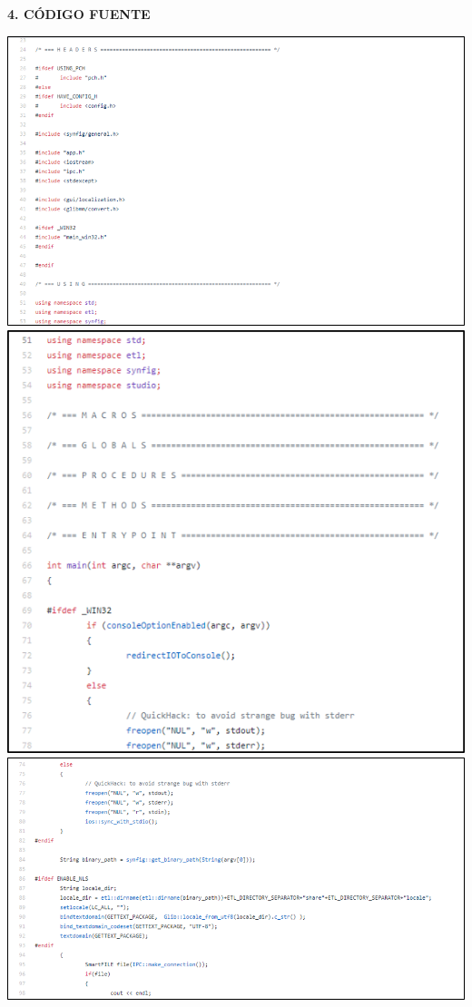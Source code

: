 \documentclass[10pt,a4paper]{article}
\begin{document}
\vspace{\baselineskip}
\textbf{4. CÓDIGO FUENTE}
\vspace{\baselineskip}
\begin{center}
\includegraphics[scale=1]{Imagen5.png}
\includegraphics[scale=1]{Imagen6.png}
\includegraphics[scale=1]{Imagen8.png}

\end{center}
\end{document}
